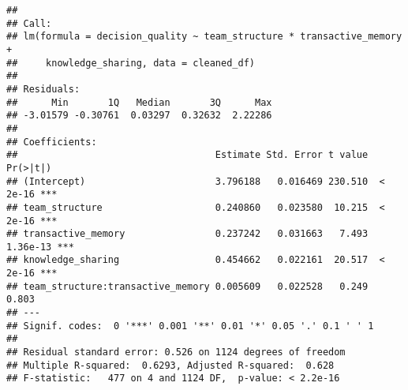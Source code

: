 \documentclass[]{article}
\newenvironment{Shaded}{\begin{snugshade}}{\end{snugshade}}
\newcommand{\DataTypeTok}[1]{\textcolor[rgb]{0.13,0.29,0.53}{#1}}
\newcommand{\DecValTok}[1]{\textcolor[rgb]{0.00,0.00,0.81}{#1}}
\newcommand{\FloatTok}[1]{\textcolor[rgb]{0.00,0.00,0.81}{#1}}
\newcommand{\KeywordTok}[1]{\textcolor[rgb]{0.13,0.29,0.53}{\textbf{#1}}}
\newcommand{\NormalTok}[1]{#1}
\newcommand{\OperatorTok}[1]{\textcolor[rgb]{0.81,0.36,0.00}{\textbf{#1}}}
\newcommand{\OtherTok}[1]{\textcolor[rgb]{0.56,0.35,0.01}{#1}}
\newcommand{\StringTok}[1]{\textcolor[rgb]{0.31,0.60,0.02}{#1}}
\begin{document}
\begin{verbatim}
## 
## Call:
## lm(formula = decision_quality ~ team_structure * transactive_memory + 
##     knowledge_sharing, data = cleaned_df)
## 
## Residuals:
##      Min       1Q   Median       3Q      Max 
## -3.01579 -0.30761  0.03297  0.32632  2.22286 
## 
## Coefficients:
##                                   Estimate Std. Error t value Pr(>|t|)    
## (Intercept)                       3.796188   0.016469 230.510  < 2e-16 ***
## team_structure                    0.240860   0.023580  10.215  < 2e-16 ***
## transactive_memory                0.237242   0.031663   7.493 1.36e-13 ***
## knowledge_sharing                 0.454662   0.022161  20.517  < 2e-16 ***
## team_structure:transactive_memory 0.005609   0.022528   0.249    0.803    
## ---
## Signif. codes:  0 '***' 0.001 '**' 0.01 '*' 0.05 '.' 0.1 ' ' 1
## 
## Residual standard error: 0.526 on 1124 degrees of freedom
## Multiple R-squared:  0.6293, Adjusted R-squared:  0.628 
## F-statistic:   477 on 4 and 1124 DF,  p-value: < 2.2e-16
\end{verbatim}

\begin{Shaded}
\end{Shaded}
\end{document}
